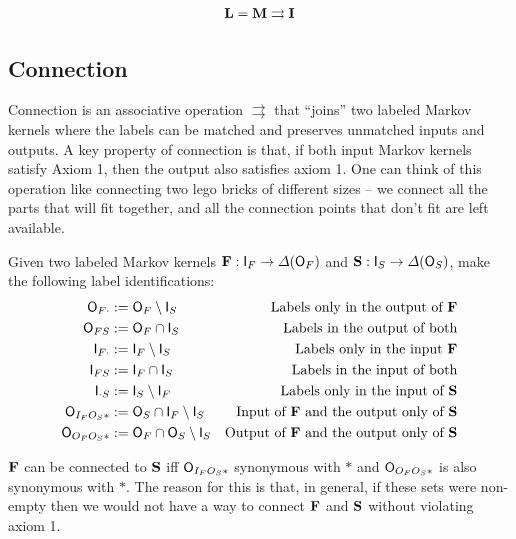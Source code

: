 \begin{align}
	\mathbf{L}=\mathbf{M}\rightrightarrows\mathbf{I}\label{eq:extn3}
\end{align}


\subsection{Connection}

Connection is an associative operation $\rightrightarrows$ that ``joins'' two labeled Markov kernels where the labels can be matched and preserves unmatched inputs and outputs. A key property of connection is that, if both input Markov kernels satisfy Axiom 1, then the output also satisfies axiom 1. One can think of this operation like connecting two lego bricks of different sizes -- we connect all the parts that will fit together, and all the connection points that don't fit are left available.

Given two labeled Markov kernels $\mathbf{F}:\mathsf{I}_F\to\Delta(\mathsf{O}_F)$ and $\mathbf{S}:\mathsf{I}_S\to\Delta(\mathsf{O}_S)$, make the following label identifications:
\begin{align}
	\mathsf{O}_{F\cdot}&:=\mathsf{O}_F\setminus\mathsf{I}_S &\text{Labels only in the output of } \mathbf{F}\\
	\mathsf{O}_{FS}&:=\mathsf{O}_F\cap\mathsf{I}_S &\text{Labels in the output of both}\\
	\mathsf{I}_{F\cdot} &:= \mathsf{I}_F\setminus \mathsf{I}_S &\text{Labels only in the input } \mathbf{F}\\
	\mathsf{I}_{FS}&:= \mathsf{I}_F\cap\mathsf{I}_S &\text{Labels in the input of both}\\
	\mathsf{I}_{\cdot S}&:= \mathsf{I}_S\setminus \mathsf{I}_F &\text{Labels only in the input of }\mathbf{S} \\
	\mathsf{O}_{I_FO_S*}&:=\mathsf{O}_S\cap \mathsf{I}_F\setminus \mathsf{I}_S &\text{Input of }\mathbf{F}\text{ and the output only of }\mathbf{S}\\
	\mathsf{O}_{O_FO_S*} &:= \mathsf{O}_F\cap\mathsf{O}_S\setminus \mathsf{I}_S&\text{Output of }\mathbf{F}\text{ and the output only of }\mathbf{S}\\
\end{align}

$\mathbf{F}$ can be connected to $\mathbf{S}$ iff $\mathsf{O}_{I_FO_S*}$ synonymous with $*$ and $\mathsf{O}_{O_FO_S*}$ is also synonymous with $*$. The reason for this is that, in general, if these sets were non-empty then we would not have a way to connect $\mathbf{F}$ and $\mathbf{S}$ without violating axiom 1.

